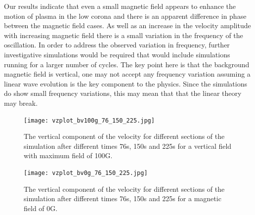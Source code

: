 \documentclass[physics,article,submit,pdftex,moreauthors]{Definitions/mdpi}
\begin{document}
  Our results indicate that even a small magnetic field appears to enhance the motion of plasma in the low corona and  there is an apparent difference in phase between the magnetic field cases. As well as an increase in the velocity amplitude with increasing magnetic field there is a small variation in the frequency of the oscillation. In order to address  the observed variation in frequency, further investigative simulations would be required  that would include simulations running for a larger number of cycles.  The key point here is that the background magnetic field is vertical, one may not accept any frequency variation assuming a linear wave evolution is the key component to the physics. Since the simulations do show small frequency variations, this may mean that that the linear theory may break.
  
\begin{figure}\label{vzplot_bv100g_76_150_225}
\texttt{[image: vzplot\_bv100g\_76\_150\_225.jpg]}
\caption{The vertical component of the velocity for different sections of the simulation after different times 76s, 150s and 225s for a vertical field with maximum field of 100G.}
\end{figure}



\begin{figure}\label{vzplot_bv0g_76_150_225}
\texttt{[image: vzplot\_bv0g\_76\_150\_225.jpg]}
\caption{The vertical component of the velocity for different sections of the simulation after different times 76s, 150s and 225s for a magnetic field of 0G.}
\end{figure}



\end{document}
